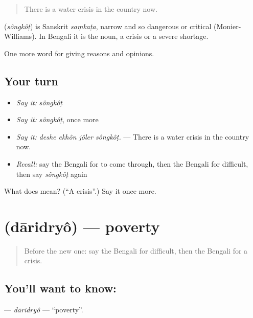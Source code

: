 \begin{quote}
There is a water crisis in the country now.
\end{quote}

\begin{cousinweb}
\textbf{} (\emph{sôngkôṭ}) is Sanskrit \emph{saṃkaṭa}, narrow and so dangerous or critical (Monier-Williams). In Bengali it is the noun, a crisis or a severe shortage.
\end{cousinweb}

\begin{grammarlens}[title={What you've built}]
One more word for giving reasons and opinions.
\end{grammarlens}

\subsection*{Your turn}
\begin{itemize}
\raggedright
  \item \emph{Say it:} \emph{sôngkôṭ}
  \item \emph{Say it:} \emph{sôngkôṭ}, once more
  \item \emph{Say it:} \emph{deshe ekhôn jôler sôngkôṭ.} — There is a water crisis in the country now.
  \item \emph{Recall:} say the Bengali for to come through, then the Bengali for difficult, then say \emph{sôngkôṭ} again
\end{itemize}

\begin{tcolorbox}[breakable,colback=teal!4,colframe=teal!35!black,title={Before you move on}]
What does  mean? (\textquotedblleft{}A crisis\textquotedblright{}.) Say it once more.
\end{tcolorbox}
\section[\texorpdfstring{\bn{দারিদ্র্য} (dāridryô)}{দারিদ্র্য (dāridryô)}]{ (dāridryô) — poverty}

\label{lesson:BN-C364-daridryo}



\begin{quote}
Before the new one: say the Bengali for difficult, then the Bengali for a crisis.
\end{quote}

\subsection*{You'll want to know: }
\textbf{} — \emph{dāridryô} — \textquotedblleft{}poverty\textquotedblright{}.

